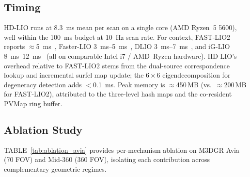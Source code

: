 \documentclass[conference]{IEEEtran}
\begin{document}
\subsection{Timing}
HD-LIO runs at \SI{8.3}{\milli\second} mean per scan on a single core
(AMD Ryzen~5 5600), well within the \SI{100}{\milli\second} budget at
\SI{10}{\hertz} scan rate. For context, FAST-LIO2 reports
$\approx$\SI{5}{\milli\second}~\cite{xu2022fastlio2},
Faster-LIO \SIrange{3}{5}{\milli\second}~\cite{bai2022fasterlio},
DLIO \SIrange{3}{7}{\milli\second}~\cite{chen2023dlio}, and
iG-LIO \SIrange{8}{12}{\milli\second}~\cite{chen2024iglio}
(all on comparable Intel i7 / AMD~Ryzen hardware).
HD-LIO's overhead relative to FAST-LIO2 stems from the dual-source
correspondence lookup and incremental surfel map update; the
$6{\times}6$ eigendecomposition for degeneracy detection adds
$<$\SI{0.1}{\milli\second}. Peak memory is $\approx$450\,MB
(vs.\ $\approx$200\,MB for FAST-LIO2), attributed to the three-level
hash maps and the co-resident PVMap ring buffer.

\subsection{Ablation Study}\label{sec:ablation}

TABLE~\ref{tab:ablation_avia} provides per-mechanism ablation on M3DGR
Avia (70\textdegree{} FOV) and Mid-360 (360\textdegree{} FOV),
isolating each contribution across complementary geometric regimes.
\end{document}
